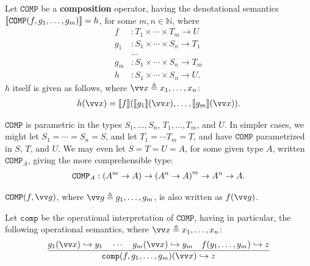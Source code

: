 \begin{definition} Let $\mathtt{COMP}$ be a \textbf{composition} operator,
having the denotational semantics ${\mathopen{}\left\llbracket{\mathtt{COMP}{\ensuremath{\mathopen{}\left({f,g_1,\ldots,g_m}\right)\mathclose{}}}}\right\rrbracket\mathclose{}} =
h$, for some $m,n\in \mathbb{N}$, where \begin{align*}
%
f & : T_1 \times \cdots \times T_m \rightarrow U \\
%
g_1 & : S_1 \times \cdots \times S_n \rightarrow T_1 \\
%
& \ldots \\
%
g_m & : S_1 \times \cdots \times S_n \rightarrow T_m \\
%
h & : S_1 \times \cdots \times S_n \rightarrow U.
%
\end{align*} $h$ itself is given as follows, where $\vect{x} \triangleq
x_1,\ldots,x_n$:\begin{align*}
%
h\p{\vect{x}} = \sem{f}\p{\sem{g_1}\p{\vect{x}}, \ldots,
\sem{g_m}\p{\vect{x}}}.
%
\end{align*}

\end{definition}

\begin{remark} $\mathtt{COMP}$ is parametric in the types $S_1,\ldots,S_n$,
$T_1,\ldots,T_m$, and $U$. In simpler cases, we might let $S_1 = \cdots = S_n =
S$, and let $T_1 = \cdots T_m = T$, and have $\mathtt{COMP}$ parametrized in
$S$, $T$, and $U$. We may even let $S=T=U=A$, for some given type $A$, written
$\mathtt{COMP}_A$, giving the more comprehensible type:\begin{align*}
%
\mathtt{COMP}_A : \p{A^m \rightarrow A} \rightarrow \p{A^n \rightarrow A}^m
\rightarrow A^n \rightarrow A.
%
\end{align*}\end{remark}

\begin{notation} $\mathtt{COMP}\p{f, \vect{g}}$, where $\vect{g} \triangleq
g_1,\ldots,g_m$, is also written as $f\p{\vect{g}}$. \end{notation}

\begin{definition} Let $\mathtt{comp}$ be the operational interpretation of
$\mathtt{COMP}$, having in particular, the following operational semantics,
where $\vect{x} \triangleq x_1, \ldots, x_n$:\begin{align*}
%
\judgement{
%
  g_1\p{\vect{x}} \goesto y_1 \quad \cdots \quad g_m\p{\vect{x}} \goesto y_m
\quad f\p{y_1,\ldots, y_m} \goesto z
%
}{
%
  \mathtt{comp}\p{f,g_1,\ldots,g_m}\p{\vect{x}} \goesto z
%
}
%
\end{align*}

\end{definition}

